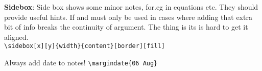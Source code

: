 \documentclass[12pt, a4paper]{article}
\begin{document}


%
\begin{minipage}[t][][t]{.6\textwidth}
	\textbf{Sidebox}: Side box shows some minor notes, for.eg in equations etc. They should provide useful hints. If and must only be used in cases where adding that extra bit of info breaks the continuity of argument. The thing is its is hard to get it aligned.\\[10pt]
	\verb|\sidebox[x][y]{width}{content}[border][fill]|
\end{minipage}

%
Always add date to notes! \verb|\margindate{06 Aug}|

\end{document}
